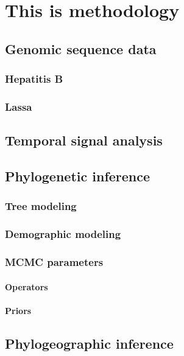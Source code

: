 \chapter{This is methodology}\label{ch:methodology}

\section{Genomic sequence data}

\subsection{Hepatitis B}

\subsection{Lassa}

\section{Temporal signal analysis}

\section{Phylogenetic inference}

\subsection{Tree modeling}

\subsection{Demographic modeling}

\subsection{MCMC parameters}

\subsubsection{Operators}

\subsubsection{Priors}

\section{Phylogeographic inference}

